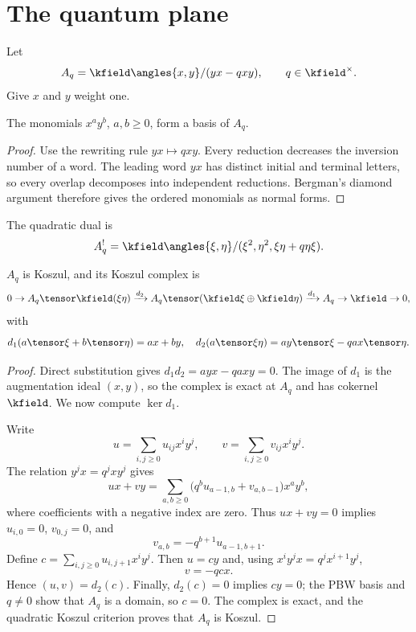 \chapter{The quantum plane}
Let
\[
 A_q=\kfield\angles{x,y}/(yx-qxy),\qquad q\in\kfield^\times.
\]
Give $x$ and $y$ weight one.

\begin{theorem}
The monomials $x^ay^b$, $a,b\ge0$, form a basis of $A_q$.
\end{theorem}
\begin{proof}
Use the rewriting rule $yx\mapsto qxy$. Every reduction decreases the inversion number of a word. The leading word $yx$ has distinct initial and terminal letters, so every overlap decomposes into independent reductions. Bergman's diamond argument therefore gives the ordered monomials as normal forms.
\end{proof}

The quadratic dual is
\[
 A_q^!=\kfield\angles{\xi,\eta}/(\xi^2,\eta^2,\xi\eta+q\eta\xi).
\]

\begin{theorem}[Koszulness]
$A_q$ is Koszul, and its Koszul complex is
\[
 0\to A_q\tensor\kfield(\xi\eta)
 \xrightarrow{d_2}
 A_q\tensor(\kfield\xi\oplus\kfield\eta)
 \xrightarrow{d_1}A_q\to\kfield\to0,
\]
with
\[
 d_1(a\tensor\xi+b\tensor\eta)=ax+by,
\quad
 d_2(a\tensor\xi\eta)=ay\tensor\xi-qax\tensor\eta.
\]
\end{theorem}
\begin{proof}
Direct substitution gives $d_1d_2=ayx-qaxy=0$. The image of $d_1$ is the augmentation ideal $(x,y)$, so the complex is exact at $A_q$ and has cokernel $\kfield$. We now compute $\ker d_1$.

Write
\[
 u=\sum_{i,j\ge0}u_{ij}x^iy^j,
 \qquad
 v=\sum_{i,j\ge0}v_{ij}x^iy^j.
\]
The relation $y^jx=q^jxy^j$ gives
\[
 ux+vy=\sum_{a,b\ge0}
 \bigl(q^b u_{a-1,b}+v_{a,b-1}\bigr)x^ay^b,
\]
where coefficients with a negative index are zero. Thus $ux+vy=0$ implies $u_{i,0}=0$, $v_{0,j}=0$, and
\[
 v_{a,b}=-q^{b+1}u_{a-1,b+1}.
\]
Define $c=\sum_{i,j\ge0}u_{i,j+1}x^iy^j$. Then $u=cy$ and, using $x^iy^jx=q^jx^{i+1}y^j$,
\[
 v=-qcx.
\]
Hence $(u,v)=d_2(c)$. Finally, $d_2(c)=0$ implies $cy=0$; the PBW basis and $q\ne0$ show that $A_q$ is a domain, so $c=0$. The complex is exact, and the quadratic Koszul criterion proves that $A_q$ is Koszul.
\end{proof}

